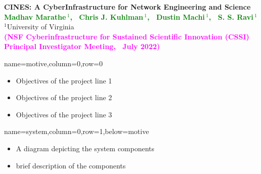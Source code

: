 \documentclass[landscape,a0paper,fontscale=0.285]{baposter} %
\begin{document}
\begin{poster}
{\begin{tabular}{c}
\end{tabular}
}
{\textbf{CINES: A CyberInfrastructure for Network Engineering and Science}
            \vspace{0.25em}
} %
{\textcolor{green}{\textbf{Madhav Marathe$\,{}^1$,~
         Chris J. Kuhlman$\,{}^{1}$,~ Dustin Machi$\,{}^{1}$,~
         S. S. Ravi$\,{}^{1}$}}\\ \vspace{0.1em} 
            {$^1$University of Virginia} \\ \vspace{0.25em}
            \textcolor{magenta}{%
               \textbf{(NSF Cyberinfrastructure for Sustained Scientific Innovation (CSSI) Principal Investigator Meeting,~ July 2022)}}
            } %

\vspace{-2.5in} %



          {name=motive,column=0,row=0}{
{\small
\begin{itemize}[leftmargin=*,noitemsep,topsep=0pt]
\item Objectives of the project line 1
\item Objectives of the project line 2
\item Objectives of the project line 3
\end{itemize}
}}


          {name=system,column=0,row=1,below=motive}{
\begin{itemize}[leftmargin=*,noitemsep,topsep=0pt]
\item A diagram depicting the system components
\item brief description of the components
\end{itemize}

}
\end{poster}
\end{document}
